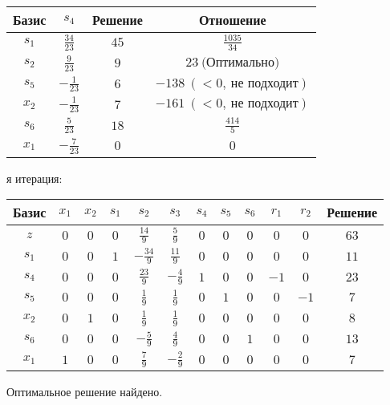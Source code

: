 \documentclass{article}%
\begin{document}
\begin{flushleft}
\begin{tabular}{|c|cccccccccc|c|}
\hline%
\end{tabular}%
\newline%
\newline%
\newline%
\begin{tabular}{|cccc|}%
\hline%
Базис&$s_{4}$&Решение&Отношение\\%
\hline%
$s_{1}$&$\frac{34}{23}$&$45$&$\frac{1035}{34}$\\%
$s_{2}$&$\frac{9}{23}$&$9$&$23\: \text{(Оптимально)}$\\%
$s_{5}$&$-\frac{1}{23}$&$6$&$-138\: (< 0, \: \text{не подходит})$\\%
$x_{2}$&$-\frac{1}{23}$&$7$&$-161\: (< 0, \: \text{не подходит})$\\%
$s_{6}$&$\frac{5}{23}$&$18$&$\frac{414}{5}$\\%
$x_{1}$&$-\frac{7}{23}$&$0$&$0$\\%
\hline%
\end{tabular}%
\newline%
\newline%
я итерация: %
\newline%
\newline%
\renewcommand{\arraystretch}{1.3}%
\begin{tabular}{|c|cccccccccc|c|}%
\hline%
Базис&$x_{1}$&$x_{2}$&$s_{1}$&$s_{2}$&$s_{3}$&$s_{4}$&$s_{5}$&$s_{6}$&$r_{1}$&$r_{2}$&Решение\\%
\hline%
$z$&$0$&$0$&$0$&$\frac{14}{9}$&$\frac{5}{9}$&$0$&$0$&$0$&$0$&$0$&$63$\\%
\hline%
$s_{1}$&$0$&$0$&$1$&$-\frac{34}{9}$&$\frac{11}{9}$&$0$&$0$&$0$&$0$&$0$&$11$\\%
$s_{4}$&$0$&$0$&$0$&$\frac{23}{9}$&$-\frac{4}{9}$&$1$&$0$&$0$&$-1$&$0$&$23$\\%
$s_{5}$&$0$&$0$&$0$&$\frac{1}{9}$&$\frac{1}{9}$&$0$&$1$&$0$&$0$&$-1$&$7$\\%
$x_{2}$&$0$&$1$&$0$&$\frac{1}{9}$&$\frac{1}{9}$&$0$&$0$&$0$&$0$&$0$&$8$\\%
$s_{6}$&$0$&$0$&$0$&$-\frac{5}{9}$&$\frac{4}{9}$&$0$&$0$&$1$&$0$&$0$&$13$\\%
$x_{1}$&$1$&$0$&$0$&$\frac{7}{9}$&$-\frac{2}{9}$&$0$&$0$&$0$&$0$&$0$&$7$\\%
\hline%
\end{tabular}%
\newline%
\end{flushleft}%
Оптимальное решение найдено.%
\newline%
\end{document}
